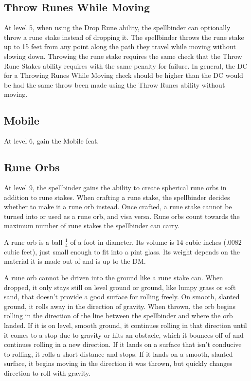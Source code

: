 \subsection{Throw Runes While Moving}
At level 5, when using the Drop Rune ability, the spellbinder can optionally throw a rune stake instead of dropping it. The spellbinder throws the rune stake up to 15 feet from any point along the path they travel while moving without slowing down. Throwing the rune stake requires the same check that the Throw Rune Stakes ability requires with the same penalty for failure. In general, the DC for a Throwing Runes While Moving check should be higher than the DC would be had the same throw been made using the Throw Runes ability without moving.

\subsection{Mobile}
At level 6, gain the Mobile feat.

\subsection{Rune Orbs}
At level 9, the spellbinder gains the ability to create spherical rune orbs in addition to rune stakes. When crafting a rune stake, the spellbinder decides whether to make it a rune orb instead. Once crafted, a rune stake cannot be turned into or used as a rune orb, and visa versa. Rune orbs count towards the maximum number of rune stakes the spellbinder can carry.

A rune orb is a ball $\frac{1}{4}$ of a foot in diameter. Its volume is $14$ cubic inches ($.0082$ cubic feet), just small enough to fit into a pint glass. Its weight depends on the material it is made out of and is up to the DM.

A rune orb cannot be driven into the ground like a rune stake can. When dropped, it only stays still on level ground or ground, like lumpy grass or soft sand, that doesn't provide a good surface for rolling freely. On smooth, slanted ground, it rolls away in the direction of gravity. When thrown, the orb begins rolling in the direction of the line between the spellbinder and where the orb landed. If it is on level, smooth ground, it continues rolling in that direction until it comes to a stop due to gravity or hits an obstacle, which it bounces off of and continues rolling in a new direction. If it lands on a surface that isn't conducive to rolling, it rolls a short distance and stops. If it lands on a smooth, slanted surface, it begins moving in the direction it was thrown, but quickly changes direction to roll with gravity.

